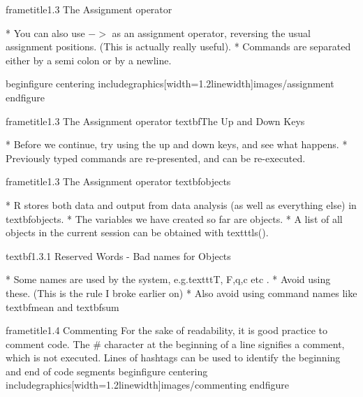  	
 	
 	
 		frametitle{1.3 The Assignment operator}
 		
 		         * You can also use $->$ as an assignment operator, reversing the
 		usual assignment positions. (This is actually really useful).
 		         * Commands are separated either by
 		a semi colon or by a newline.
 		
 		begin{figure}
 			centering
 			includegraphics[width=1.2linewidth]{images/assignment}
 		end{figure}
 		
 	
 	
 	
 		frametitle{1.3 The Assignment operator}
 		textbf{The Up and Down Keys}
 		
 			         * Before we continue, try using the up and down keys, and see what happens. 
 			         * Previously
 			typed commands are re-presented, and can be re-executed.
 		
 		
 	
 	
 		frametitle{1.3 The Assignment operator }
 		textbf{objects}
 		
 			         * R stores both data and output from data analysis (as well as everything else) in textbf{objects}.
 			         * The variables we have created so far are objects. 
 			         * A list of all objects in the current session can
 			be obtained with texttt{ls()}.
 		
 	
 	textbf{1.3.1 Reserved Words - Bad names for Objects}
 	
 		         * Some names are used by the system, e.g.texttt{T, F,q,c} etc . 
 		         * Avoid using these. (This is the rule I broke earlier on)
 		         * Also avoid using command names like textbf{mean} and textbf{sum}
 	
 	
 	
  
 	
 		frametitle{1.4 Commenting}
 		For the sake of readability, it is good practice to comment code. The # character at the
 		beginning of a line signifies a comment, which is not executed. Lines of hashtags can be used
 		to identify the beginning and end of code segments
 		begin{figure}
 			centering
 			includegraphics[width=1.2linewidth]{images/commenting}
 		end{figure}
 		
